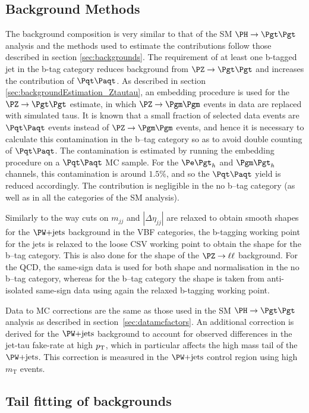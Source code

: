 \subsection{Background Methods}
\label{sec:mssmBackgrounds}
The background composition is very similar to that of the \ac{SM} $\HToTauTau$
analysis and the methods used to estimate the contributions follow those
described in section \ref{sec:backgrounds}. The requirement of at least one
b-tagged jet in the b-tag category reduces background from $\ZToTauTau$
and increases the contribution of $\ttbar$. As described in section
\ref{sec:backgroundEstimation_Ztautau}, an embedding procedure is used for the
$\ZToTauTau$ estimate, in which $\PZ\to\Pgm\Pgm$ events in data are replaced
with simulated taus. It is known that a small fraction of selected data events
are $\ttbar$ events instead of $\PZ\to\Pgm\Pgm$ events, and hence it is
necessary to calculate this contamination in the b--tag category so as to avoid
double counting of $\ttbar$. The contamination is estimated by running the
embedding procedure on a $\ttbar$ \ac{MC} sample. For the $\etau$ and $\mutau$ channels, this
contamination is around $1.5\%$, and so the $\ttbar$ yield is reduced
accordingly. The contribution is negligible in the no b--tag category (as well
as in all the categories of the \ac{SM} analysis). 

Similarly to the way cuts on $m_{jj}$ and $|\Delta\eta_{jj}|$ are relaxed to
obtain smooth shapes for the $\WJets$ background in the VBF categories, the
b-tagging working point for the jets is relaxed to the loose \ac{CSV} working point to
obtain the shape for the b--tag category. This is also done for the shape of
the $\PZ\to\ell\ell$ background. For the QCD, the same-sign data is used for
both shape and normalisation in the no b--tag category, whereas for the b--tag
category the shape is taken from anti-isolated same-sign data using again the relaxed
b-tagging working point.

Data to \ac{MC} corrections are the same as those used in the \ac{SM}
$\HToTauTau$ analysis as described in section~\ref{sec:datamcfactors}. An
additional correction is derived for the $\WJets$ background to account for
observed differences in the jet-tau fake-rate at high $p_{\mathrm{T}}$, which in particular
affects the high mass tail of the $\WJets$. This correction is measured in the
$\WJets$ control region using high $m_{\mathrm{T}}$ events. 

\subsection{Tail fitting of backgrounds}
\label{sec:tailfitting}

